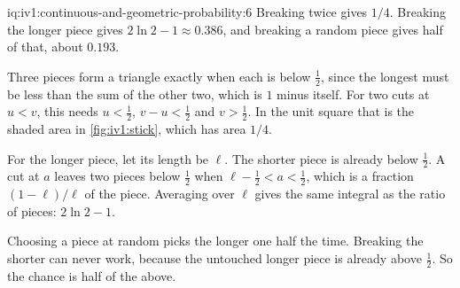 \begin{solution}{iq:iv1:continuous-and-geometric-probability:6}
Breaking twice gives $1/4$. Breaking the longer piece gives $2\ln 2 - 1 \approx 0.386$, and breaking a random piece gives half of that, about $0.193$.

Three pieces form a triangle exactly when each is below $\tfrac12$, since the longest must be less than the sum of the other two, which is $1$ minus itself. For two cuts at $u < v$, this needs $u < \tfrac12$, $v - u < \tfrac12$ and $v > \tfrac12$. In the unit square that is the shaded area in \cref{fig:iv1:stick}, which has area $1/4$.

For the longer piece, let its length be $\ell$. The shorter piece is already below $\tfrac12$. A cut at $a$ leaves two pieces below $\tfrac12$ when $\ell - \tfrac12 < a < \tfrac12$, which is a fraction $(1 - \ell)/\ell$ of the piece. Averaging over $\ell$ gives the same integral as the ratio of pieces: $2\ln 2 - 1$.

Choosing a piece at random picks the longer one half the time. Breaking the shorter can never work, because the untouched longer piece is already above $\tfrac12$. So the chance is half of the above.

\begin{omfigure}

\label{fig:iv1:stick}
\end{omfigure}

\end{solution}

